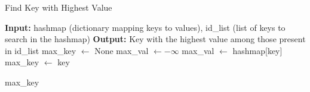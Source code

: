 \documentclass{article}
\begin{document}
\begin{algorithm}
\caption{Find Key with Highest Value}
\label{alg:find_key_with_highest_value}
\begin{algorithmic}[1]
\State \textbf{Input:} hashmap (dictionary mapping keys to values), id\_list (list of keys to search in the hashmap)
\State \textbf{Output:} Key with the highest value among those present in id\_list
\State max\_key $\gets$ None 
\State max\_val $\gets -\infty$ 
            \State max\_val $\gets$ hashmap[key] 
            \State max\_key $\gets$ key 
            
        \EndIf
    \EndIf
\EndFor
\State \Return max\_key
\EndProcedure
\end{algorithmic}
\end{algorithm}
        
\end{document}
